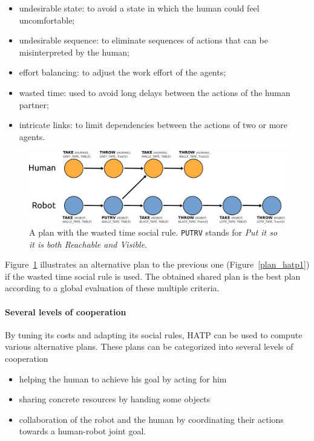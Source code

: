 \documentclass[preprint,3p,times]{elsarticle}
\begin{document}
\begin{itemize}
\item undesirable state: to avoid a state in which the human could
  feel uncomfortable;
\item undesirable sequence: to eliminate sequences of actions that can
  be misinterpreted by the human;
\item effort balancing: to adjust the work effort of the agents;
\item wasted time: used to avoid long delays between the actions of
  the human partner;
\item intricate links: to limit dependencies between the actions of
  two or more agents.
\end{itemize}

\begin{figure}[htbp]
  \centering
  \includegraphics[width=0.95\columnwidth]{second_plan.pdf}
  \caption{A plan with the wasted time social rule. {\tt PUTRV} stands for {\it Put it so it is both Reachable and Visible}.}
  \label{plan_hatp2}
\end{figure}

Figure~\ref{plan_hatp2} illustrates an alternative plan to the previous 
one (Figure~\ref{plan_hatp1}) if the wasted time social rule is used.
The obtained shared plan is the best plan according to a global evaluation of
these multiple criteria.

\paragraph{Several levels of cooperation} 
By tuning its costs
and adapting its social rules, HATP can be used to compute various
alternative plans. These plans can be categorized into several levels
of cooperation

\begin{itemize}
\item helping the human to achieve his goal by acting for him
\item sharing concrete resources by handing some objects
\item collaboration of the robot and the human by coordinating their
  actions towards a human-robot joint goal.
\end{itemize}
\end{document}
